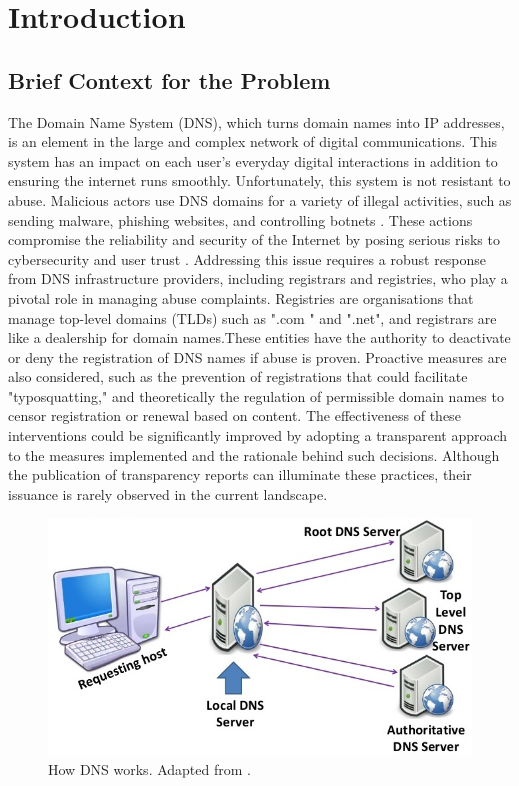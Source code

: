 \chapter{Introduction}


\section{Brief Context for the Problem}

The Domain Name System (DNS), which turns domain names into IP addresses, is an element in the large and complex network of digital communications. This system has an impact on each user's everyday digital interactions in addition to ensuring the internet runs smoothly. Unfortunately, this system is not resistant to abuse. Malicious actors use DNS domains for a variety of illegal activities, such as sending malware, phishing websites, and controlling botnets \cite{so2022}. These actions compromise the reliability and security of the Internet by posing serious risks to cybersecurity and user trust \cite{bayer2022}. Addressing this issue requires a robust response from DNS infrastructure providers, including registrars and registries, who play a pivotal role in managing abuse complaints. Registries are organisations that manage top-level domains (TLDs) such as ".com " and ".net", and registrars are like a dealership for domain names.These entities have the authority to deactivate or deny the registration of DNS names if abuse is proven. Proactive measures are also considered, such as the prevention of registrations that could facilitate "typosquatting," and theoretically the regulation of permissible domain names to censor registration or renewal based on content. The effectiveness of these interventions could be significantly improved by adopting a transparent approach to the measures implemented and the rationale behind such decisions. Although the publication of transparency reports can illuminate these practices, their issuance is rarely observed in the current landscape.

\begin{figure}[H]
    \centering
    \includegraphics[width=0.5\linewidth]{introduction/dnsWork.jpg}
    \caption{How DNS works. Adapted from \cite{blanche2018understandingDNS}. }
    \label{fig:dnsIntro}
\end{figure}

